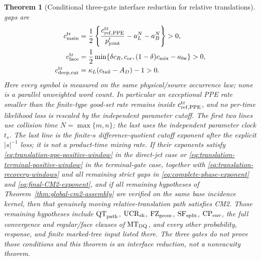 \documentclass[11pt]{article}
\newtheorem{theorem}{Theorem}[section]
\begin{document}
\begin{theorem}[Conditional three-gate interface reduction for relative translations]
gaps are
\begin{equation}
\label{eq:translation-three-new-margins}
\begin{split}
 c_{\rm main}^{\rm tr}
 &=\frac12\left\{\frac{c_{{\rm ref},{\rm PPE}}^{\rm tr}}
                         {p_{\rm joint}'}
                  -a_L^N-a_B^N\right\}>0,\\
 c_{\rm face}^{\rm tr}
 &=\frac12\min\{\delta c_R,c_{\rm or},
                  (1-\delta)c_{\rm mix}-a_{\rm fw}\}>0,\\
 c_{\rm deep,cut}^{\rm tr}
 &=\kappa_L(c_{\rm tail}-A_D)-1>0.
\end{split}
\end{equation}
Here every symbol is measured on the same physical/source occurrence law;
none is a parallel unweighted word count.  In particular an exceptional
PPE rate smaller than the finite-type good-set rate remains inside
$c_{{\rm ref},{\rm PPE}}^{\rm tr}$, and no per-time likelihood loss is
rescaled by the independent parameter cutoff.  The first two lines use collision
time $N=\max\{m,n\}$; the last uses the independent parameter clock $t_s$.
The last line is the finite-$s$
difference-quotient cutoff exponent after the explicit $|s|^{-1}$ loss; it
is not a product-time mixing rate.  If their exponents satisfy
\eqref{eq:translation-ppe-positive-window} in the direct-jet case or
\eqref{eq:translation-terminal-positive-window} in the terminal-gate case,
together with \eqref{eq:translation-recovery-windows} and all remaining strict gaps in
\eqref{eq:complete-phase-exponent} and
\eqref{eq:final-CM2-exponent}, and if \emph{all} remaining hypotheses of
Theorem~\ref{thm:global-cm2-assembly} are verified on the same base incidence
kernel, then that genuinely moving relative-translation path satisfies CM2.
Those remaining hypotheses include $\mathrm{QT}_{\rm path}$,
$\mathrm{UCR}_{\rm sh}$, $\mathrm{FZ}_{\rm geom}$,
$\mathrm{SF}_{\rm split}$, $\mathrm{CP}_{\rm env}$, the full convergence
and regular/face clauses of $\mathrm{MT}_{\rm DQ}$, and every other
probability, response, and finite marked-tree input listed there.  The three
gates do not prove those conditions and this theorem is an interface
reduction, not a nonvacuity theorem.
\end{theorem}
\end{document}
